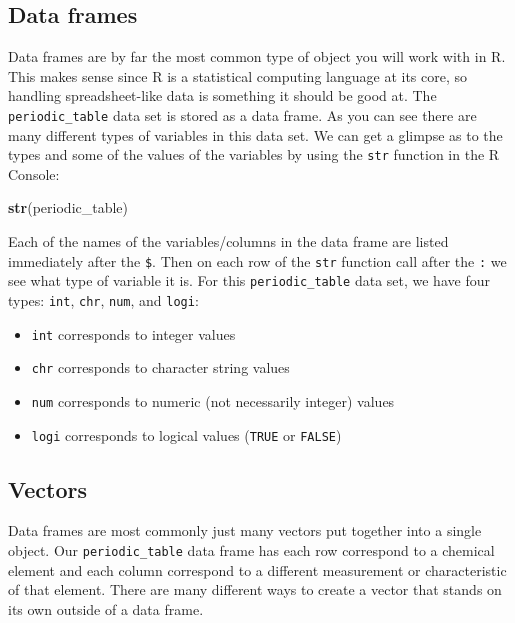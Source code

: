 \documentclass[]{tufte-book}
\newenvironment{Shaded}{\begin{snugshade}}{\end{snugshade}}
\newcommand{\KeywordTok}[1]{\textcolor[rgb]{0.13,0.29,0.53}{\textbf{{#1}}}}
\newcommand{\NormalTok}[1]{{#1}}
\providecommand{\tightlist}{%
  \setlength{\itemsep}{0pt}\setlength{\parskip}{0pt}}
\begin{document}
\subsection{Data frames}\label{data-frames}

Data frames are by far the most common type of object you will work with
in R. This makes sense since R is a statistical computing language at
its core, so handling spreadsheet-like data is something it should be
good at. The \texttt{periodic\_table} data set is stored as a data
frame. As you can see there are many different types of variables in
this data set. We can get a glimpse as to the types and some of the
values of the variables by using the \texttt{str} function in the R
Console:

\begin{Shaded}
\begin{Highlighting}[]
\KeywordTok{str}\NormalTok{(periodic_table)}
\end{Highlighting}
\end{Shaded}

Each of the names of the variables/columns in the data frame are listed
immediately after the \texttt{\$}. Then on each row of the \texttt{str}
function call after the \texttt{:} we see what type of variable it is.
For this \texttt{periodic\_table} data set, we have four types:
\texttt{int}, \texttt{chr}, \texttt{num}, and \texttt{logi}:

\begin{itemize}
\tightlist
\item
  \texttt{int} corresponds to integer values
\item
  \texttt{chr} corresponds to character string values
\item
  \texttt{num} corresponds to numeric (not necessarily integer) values
\item
  \texttt{logi} corresponds to logical values (\texttt{TRUE} or
  \texttt{FALSE})
\end{itemize}

\subsection{Vectors}\label{vectors}

Data frames are most commonly just many vectors put together into a
single object. Our \texttt{periodic\_table} data frame has each row
correspond to a chemical element and each column correspond to a
different measurement or characteristic of that element. There are many
different ways to create a vector that stands on its own outside of a
data frame. \newline\vspace*{0.1in}
\end{document}
